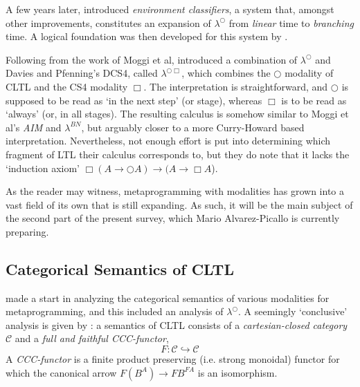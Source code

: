 \documentclass[a4paper]{amsart}
\begin{document}
A few years later, \cite{Taha2003a} introduced \emph{environment
classifiers}, a system that, amongst other improvements,
constitutes an expansion of $\lambda^\bigcirc$ from \emph{linear}
time to \emph{branching} time. A logical foundation was then
developed for this system by \cite{Tsukada2010}.

Following from the work of Moggi et al, \cite{Yuse2006} introduced
a combination of $\lambda^\bigcirc$ and Davies and Pfenning's
\textsf{DCS4}, called $\lambda^{\bigcirc\Box}$, which combines the
$\bigcirc$ modality of \textsf{CLTL} and the \textsf{CS4} modality
$\Box$. The interpretation is straightforward, and $\bigcirc$ is
supposed to be read as `in the next step' (or stage), whereas
$\Box$ is to be read as `always' (or, in all stages). The
resulting calculus is somehow similar to Moggi et al's \emph{AIM}
and $\lambda^{BN}$, but arguably closer to a more Curry-Howard
based interpretation. Nevertheless, not enough effort is put into
determining which fragment of LTL their calculus corresponds to,
but they do note that it lacks the `induction axiom' $\Box (A
\rightarrow \bigcirc A) \rightarrow (A \rightarrow \Box A$).

As the reader may witness, metaprogramming with modalities has
grown into a vast field of its own that is still expanding. As
such, it will be the main subject of the second part of the
present survey, which Mario Alvarez-Picallo is currently
preparing.

\subsection{Categorical Semantics of \textsf{CLTL}}

\cite{Benaissa1998a} made a start in analyzing the categorical
semantics of various modalities for metaprogramming, and this
included an analysis of $\lambda^\bigcirc$. A seemingly
`conclusive' analysis is given by \cite{Benaissa1999}: a semantics
of \textsf{CLTL} consists of a \emph{cartesian-closed category}
$\mathcal{C}$ and a \emph{full and faithful CCC-functor}, \[
  F : \mathcal{C} \hookrightarrow \mathcal{C}
\] A \emph{CCC-functor} is a finite product preserving (i.e.
strong monoidal) functor for which the canonical arrow $F(B^A)
\rightarrow FB^{FA}$ is an isomorphism.
\end{document}
